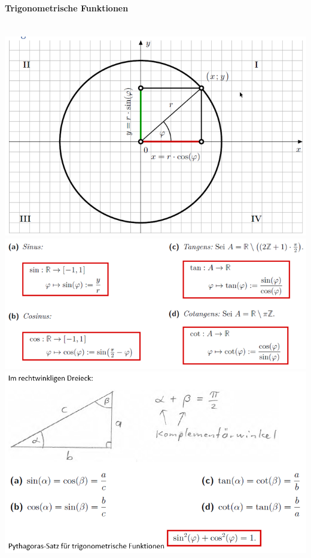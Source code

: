 \paragraph{Trigonometrische Funktionen}\mbox{}\\
\noindent
\includegraphics[width=\columnwidth]{./images/trigo_circle.png}
\includegraphics[width=\columnwidth]{./images/trigo_circle1.png}
\includegraphics[width=\columnwidth]{./images/trigo_circle2.png}
